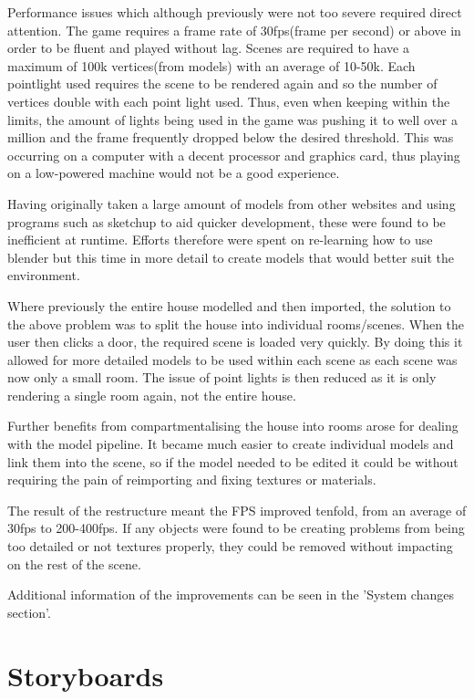 \documentclass[11pt]{report}
\begin{document}
Performance issues which although previously were not too severe required direct attention. The game requires a frame rate of 30fps(frame per second) or above in order to be fluent and played without lag. Scenes are required to have a maximum of 100k vertices(from models) with an average of 10-50k. Each pointlight used requires the scene to be rendered again and so the number of vertices double with each point light used. Thus, even when keeping within the limits, the amount of lights being used in the game was pushing it to well over a million and the frame frequently dropped below the desired threshold. This was occurring on a computer with a decent processor and graphics card, thus playing on a low-powered machine would not be a good experience.  

Having originally taken a large amount of models from other websites and using programs such as sketchup to aid quicker development, these were found to be inefficient at runtime. Efforts therefore were spent on re-learning how to use blender but this time in more detail to create models that would better suit the environment. 

Where previously the entire house modelled and then imported, the solution to the above problem was to split the house into individual rooms/scenes. When the user then clicks a door, the required scene is loaded very quickly. By doing this it allowed for more detailed models to be used within each scene as each scene was now only a small room. The issue of point lights is then reduced as it is only rendering a single room again, not the entire house. 

Further benefits from compartmentalising the house into rooms arose for dealing with the model pipeline. It became much easier to create individual models and link them into the scene, so if the model needed to be edited it could be without requiring the pain of reimporting and fixing textures or materials. 

The result of the restructure meant the FPS improved tenfold, from an average of 30fps to 200-400fps. If any objects were found to be creating problems from being too detailed or not textures properly, they could be removed without impacting on the rest of the scene.

Additional information of the improvements can be seen in the 'System changes section'.

\section{Storyboards}
\end{document}
